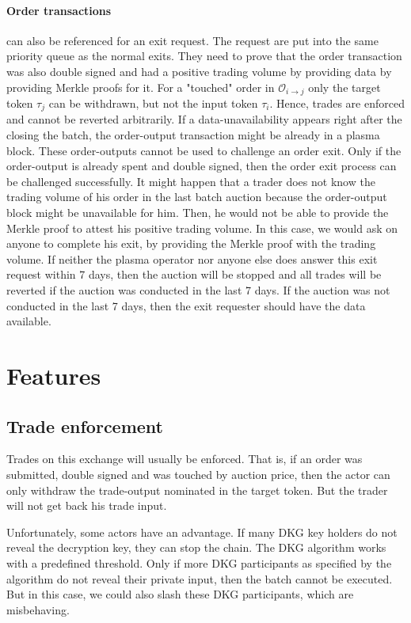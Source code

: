 \documentclass[11pt,parskip=full]{scrartcl}%
\def\pO{\mathcal{O}}
\def\ra{\rightarrow}
\begin{document}
\paragraph{Order transactions} can also be referenced for an exit request. The request are put into the same priority queue as the normal exits. They need to prove that the order transaction was also double signed and had a positive trading volume by providing data by providing Merkle proofs for it.
For a "touched" order in $\pO_{i\ra j}$ only the target token $\tau_j$ can be withdrawn, but not the input token $\tau_i$. 
Hence, trades are enforced and cannot be reverted arbitrarily. 
If a data-unavailability appears right after the closing the batch, the order-output transaction might be already in a plasma block. 
These order-outputs cannot be used to challenge an order exit. 
Only if the order-output is already spent and double signed, then the order exit process can be challenged successfully. 
It might happen that a trader does not know the trading volume of his order in the last batch auction because the order-output block might be unavailable for him. 
Then, he would not be able to provide the Merkle proof to attest his positive trading volume. 
In this case, we would ask on anyone to complete his exit, by providing the Merkle proof with the trading volume. 
If neither the plasma operator nor anyone else does answer this exit request within 7 days, then the auction will be stopped and all trades will be reverted if the auction was conducted in the last 7 days. If the auction was not conducted in the last 7 days, then the exit requester should have the data available.


\newpage

\section{Features}

\subsection{Trade enforcement}
Trades on this exchange will usually be enforced. 
That is, if an order was submitted, double signed and was touched by auction price, then the actor can only withdraw the trade-output nominated in the target token. 
But the trader will not get back his trade input. 

Unfortunately, some actors have an advantage.
If many DKG key holders do not reveal the decryption key, they can stop the chain. 
The DKG algorithm works with a predefined threshold. 
Only if more DKG participants as specified by the algorithm do not reveal their private input, then the batch cannot be executed. 
But in this case, we could also slash these DKG participants, which are misbehaving. 
\end{document}
